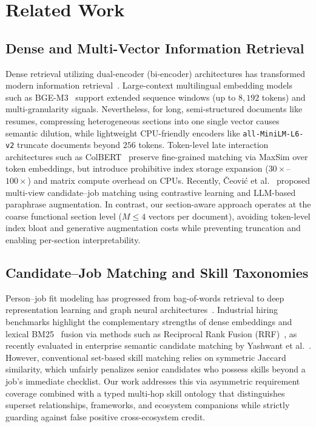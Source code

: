 \section{Related Work}

\subsection{Dense and Multi-Vector Information Retrieval}
Dense retrieval utilizing dual-encoder (bi-encoder) architectures has transformed modern information retrieval~\cite{reimers2019sentencebert,karpukhin2020dense}. Large-context multilingual embedding models such as BGE-M3~\cite{chen2024bge} support extended sequence windows (up to $8{,}192$ tokens) and multi-granularity signals. Nevertheless, for long, semi-structured documents like resumes, compressing heterogeneous sections into one single vector causes semantic dilution, while lightweight CPU-friendly encoders like \texttt{all-MiniLM-L6-v2} truncate documents beyond $256$ tokens. Token-level late interaction architectures such as ColBERT~\cite{khattab2020colbert} preserve fine-grained matching via MaxSim over token embeddings, but introduce prohibitive index storage expansion ($30\times$--$100\times$) and matrix compute overhead on CPUs. Recently, \v{C}eovi\'{c} et al.~\cite{ceovic2026multiview} proposed multi-view candidate--job matching using contrastive learning and LLM-based paraphrase augmentation. In contrast, our section-aware approach operates at the coarse functional section level ($M \le 4$ vectors per document), avoiding token-level index bloat and generative augmentation costs while preventing truncation and enabling per-section interpretability.

\subsection{Candidate--Job Matching and Skill Taxonomies}
Person--job fit modeling has progressed from bag-of-words retrieval to deep representation learning and graph neural architectures~\cite{zhu2018person,bian2020learning,zhang2021personalized}. Industrial hiring benchmarks highlight the complementary strengths of dense embeddings and lexical BM25~\cite{robertson2009probabilistic} fusion via methods such as Reciprocal Rank Fusion (RRF)~\cite{cormack2009reciprocal}, as recently evaluated in enterprise semantic candidate matching by Yashwant et al.~\cite{yashwant2026semantic}. However, conventional set-based skill matching relies on symmetric Jaccard similarity, which unfairly penalizes senior candidates who possess skills beyond a job's immediate checklist. Our work addresses this via asymmetric requirement coverage combined with a typed multi-hop skill ontology that distinguishes superset relationships, frameworks, and ecosystem companions while strictly guarding against false positive cross-ecosystem credit.

